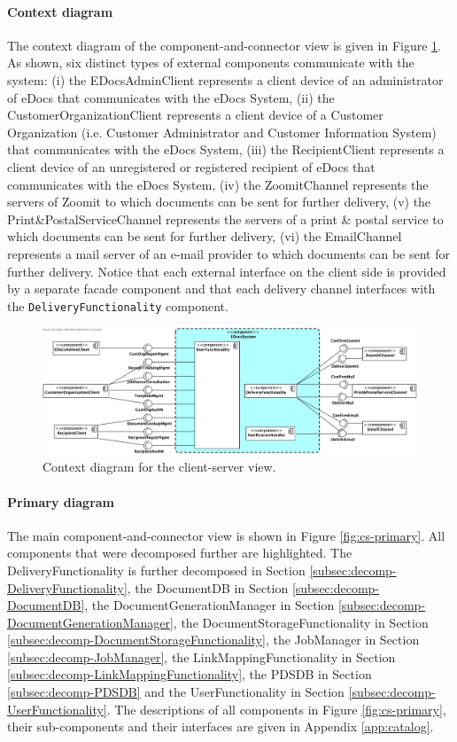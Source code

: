 \documentclass[a4paper,10pt]{article}
\begin{document}
\paragraph{Context diagram}
The context diagram of the component-and-connector view is given in Figure \ref{fig:cc-context}. As shown, six distinct types of external components communicate with the system:
(i) the EDocsAdminClient represents a client device of an administrator of eDocs that communicates with the eDocs System,
(ii) the CustomerOrganizationClient represents a client device of a Customer Organization (i.e. Customer Administrator and Customer Information System) that communicates with the eDocs System,
(iii) the RecipientClient represents a client device of an unregistered or registered recipient of eDocs that communicates with the eDocs System,
(iv) the ZoomitChannel represents the servers of Zoomit to which documents can be sent for further delivery,
(v) the Print\&PostalServiceChannel represents the servers of a print \& postal service to which documents can be sent for further delivery,
(vi) the EmailChannel represents a mail server of an e-mail provider to which documents can be sent for further delivery.
Notice that each external interface on the client side is provided by a separate facade component and that each delivery channel interfaces with the \texttt{DeliveryFunctionality} component.

\begin{figure}[!htp]
	\centering
	\includegraphics[height=0.9\textheight]{ContextDiagram.png}
	\caption{Context diagram for the client-server view.}
	\label{fig:cc-context}
\end{figure}
\FloatBarrier

\paragraph{Primary diagram}
The main component-and-connector view is shown in Figure \ref{fig:cs-primary}. All components that were decomposed further are highlighted. The DeliveryFunctionality is further decomposed in Section \ref{subsec:decomp-DeliveryFunctionality}, the DocumentDB in Section \ref{subsec:decomp-DocumentDB}, the DocumentGenerationManager in Section \ref{subsec:decomp-DocumentGenerationManager}, the DocumentStorageFunctionality in Section \ref{subsec:decomp-DocumentStorageFunctionality}, the JobManager in Section \ref{subsec:decomp-JobManager}, the LinkMappingFunctionality in Section \ref{subsec:decomp-LinkMappingFunctionality}, the PDSDB in Section \ref{subsec:decomp-PDSDB} and the UserFunctionality in Section \ref{subsec:decomp-UserFunctionality}. The descriptions of all components in Figure \ref{fig:cs-primary}, their sub-components and their interfaces are given in Appendix \ref*{app:catalog}.
\end{document}
